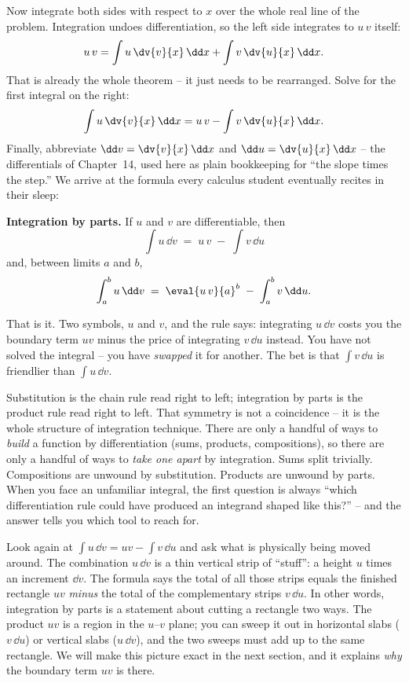 Now integrate both sides with respect to $x$ over the whole real line of the
problem. Integration undoes differentiation, so the left side integrates to
$u\,v$ itself:
\[
u\,v = \int u\,\dv{v}{x}\,\dd x + \int v\,\dv{u}{x}\,\dd x.
\]
That is already the whole theorem -- it just needs to be rearranged. Solve for
the first integral on the right:
\[
\int u\,\dv{v}{x}\,\dd x = u\,v - \int v\,\dv{u}{x}\,\dd x.
\]
Finally, abbreviate $\dd v = \dv{v}{x}\,\dd x$ and $\dd u = \dv{u}{x}\,\dd x$ --
the differentials of Chapter~14, used here as plain bookkeeping for ``the slope
times the step.'' We arrive at the formula every calculus student eventually
recites in their sleep:

\begin{focusbox}
\textbf{Integration by parts.} If $u$ and $v$ are differentiable, then
\[
\boxed{\;\int u\,\dd v \;=\; u\,v \;-\; \int v\,\dd u\;}
\]
and, between limits $a$ and $b$,
\[
\int_{a}^{b} u\,\dd v \;=\; \eval{u\,v}{a}^{b} \;-\; \int_{a}^{b} v\,\dd u.
\]
\end{focusbox}

That is it. Two symbols, $u$ and $v$, and the rule says: integrating $u\,\dd v$
costs you the boundary term $uv$ minus the price of integrating $v\,\dd u$
instead. You have not solved the integral -- you have \emph{swapped} it for
another. The bet is that $\int v\,\dd u$ is friendlier than $\int u\,\dd v$.

\begin{whybox}
Substitution is the chain rule read right to left; integration by parts is the
product rule read right to left. That symmetry is not a coincidence -- it is the
whole structure of integration technique. There are only a handful of ways to
\emph{build} a function by differentiation (sums, products, compositions), so
there are only a handful of ways to \emph{take one apart} by integration. Sums
split trivially. Compositions are unwound by substitution. Products are unwound
by parts. When you face an unfamiliar integral, the first question is always
``which differentiation rule could have produced an integrand shaped like this?''
-- and the answer tells you which tool to reach for.
\end{whybox}

\begin{happeningbox}
Look again at $\int u\,\dd v = uv - \int v\,\dd u$ and ask what is physically
being moved around. The combination $u\,\dd v$ is a thin vertical strip of
``stuff'': a height $u$ times an increment $\dd v$. The formula says the total of
all those strips equals the finished rectangle $uv$ \emph{minus} the total of the
complementary strips $v\,\dd u$. In other words, integration by parts is a
statement about cutting a rectangle two ways. The product $uv$ is a region in the
$u$--$v$ plane; you can sweep it out in horizontal slabs ($v\,\dd u$) or vertical
slabs ($u\,\dd v$), and the two sweeps must add up to the same rectangle. We will
make this picture exact in the next section, and it explains \emph{why} the
boundary term $uv$ is there.
\end{happeningbox}

